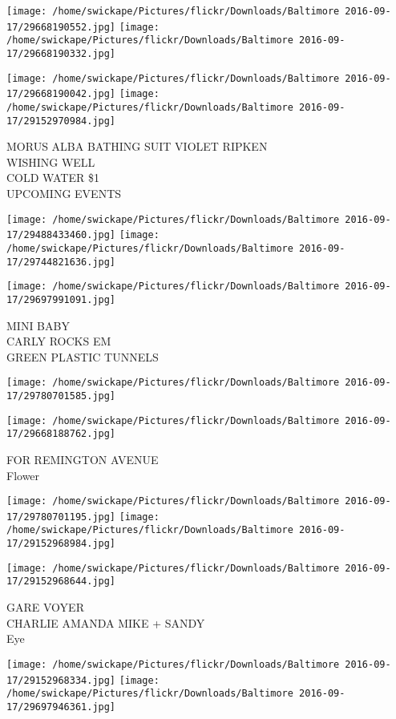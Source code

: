 \documentclass[10pt,letterpaper]{article}
\begin{document}
\texttt{[image: /home/swickape/Pictures/flickr/Downloads/Baltimore 2016-09-17/29668190552.jpg]}
\texttt{[image: /home/swickape/Pictures/flickr/Downloads/Baltimore 2016-09-17/29668190332.jpg]}

\texttt{[image: /home/swickape/Pictures/flickr/Downloads/Baltimore 2016-09-17/29668190042.jpg]}
\texttt{[image: /home/swickape/Pictures/flickr/Downloads/Baltimore 2016-09-17/29152970984.jpg]}

MORUS ALBA BATHING SUIT VIOLET RIPKEN\\
WISHING WELL\\
COLD WATER \$1\\
UPCOMING EVENTS
\pagebreak

\texttt{[image: /home/swickape/Pictures/flickr/Downloads/Baltimore 2016-09-17/29488433460.jpg]}
\texttt{[image: /home/swickape/Pictures/flickr/Downloads/Baltimore 2016-09-17/29744821636.jpg]}

\texttt{[image: /home/swickape/Pictures/flickr/Downloads/Baltimore 2016-09-17/29697991091.jpg]}

MINI BABY\\
CARLY ROCKS EM\\
GREEN PLASTIC TUNNELS
\pagebreak

\texttt{[image: /home/swickape/Pictures/flickr/Downloads/Baltimore 2016-09-17/29780701585.jpg]}

\vspace{0.25in}
\texttt{[image: /home/swickape/Pictures/flickr/Downloads/Baltimore 2016-09-17/29668188762.jpg]}

FOR REMINGTON AVENUE\\
Flower
\pagebreak

\texttt{[image: /home/swickape/Pictures/flickr/Downloads/Baltimore 2016-09-17/29780701195.jpg]}
\texttt{[image: /home/swickape/Pictures/flickr/Downloads/Baltimore 2016-09-17/29152968984.jpg]}

\vspace{0.25in}
\texttt{[image: /home/swickape/Pictures/flickr/Downloads/Baltimore 2016-09-17/29152968644.jpg]}

GARE VOYER\\
CHARLIE AMANDA MIKE + SANDY\\
Eye
\pagebreak

\texttt{[image: /home/swickape/Pictures/flickr/Downloads/Baltimore 2016-09-17/29152968334.jpg]}
\texttt{[image: /home/swickape/Pictures/flickr/Downloads/Baltimore 2016-09-17/29697946361.jpg]}
\end{document}
